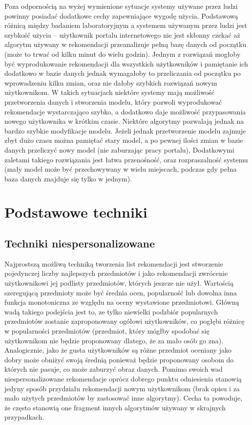 \documentclass{pracamgr}
\begin{document}
   Poza odpornością na wyżej wymienione sytuacje systemy używane przez ludzi powinny posiadać dodatkowe cechy zapewniające wygodę użycia.
   Podstawową różnicą między badaniem laboratoryjnym a systemem używanym przez ludzi jest szybkość użycia --
   użytkownik portalu internetowego nie jest skłonny czekać aż algorytm używany w rekomendacji przeanalizuje pełną bazę danych od początku
   (może to trwać od kilku minut do wielu godzin).
   Jednym z rozwiązań mogłoby być wyprodukowanie rekomendacji dla wszystkich użytkowników i pamiętanie ich dodatkowo w bazie danych
   jednak wymagałoby to przeliczania od początku po wprowadzeniu kilku zmian, oraz nie dałoby szybkich rozwiązań nowym użytkownikom.
   W takich sytuacjach niektóre systemy mają możliwość przetworzenia danych i stworzenia modelu,
   który pozwoli wyprodukować rekomendacje wystarczająco szybko, a dodatkowo daje możliwość przypasowania nowego użytkownika w krótkim czasie.
   Niektóre algorytmy pozwalają jednak na bardzo szybkie modyfikacje modelu.
   Jeżeli jednak przetworzenie modelu zajmuje zbyt dużo czasu można pamiętać stary model,
   a po pewnej ilości zmian w bazie danych przeliczyć nowy model (nie zaburzając pracy portalu),
   Dodatkowymi zaletami takiego rozwiązania jest łatwa przenośność, oraz rozpraszalność systemu (mały model może być przechowywany w wielu miejscach,
   podczas gdy pełna baza danych znajduje się tylko w jednym).

 \chapter{Podstawowe techniki}
  \section{Techniki niespersonalizowane}
   Najprostszą możliwą techniką tworzenia list rekomendacji jest stworzenie pojedynczej liczby najlepszych przedmiotów
   i jako rekomendacji zwrócenie użytkownikowi jej podlisty przedmiotów, których jeszcze nie użył.
   Wartością szeregującą przedmioty może być średnia ocen, popularność lub dowolna inna funkcja monotoniczna ze względu na oceny wystawione przedmiotowi.
   Główną wadą takiego podejścia jest to, ze tylko niewielki podzbiór popularnych przedmiotów zostanie zaproponowany ogółowi użytkowników,
   co pogłębi różnicę w popularności przedmiotów (przedmiot, który mógłby spodobać się użytkownikom nie będzie proponowany dlatego, że za mało osób go zna).
   Analogicznie, jako że gusta użytkowników są różne przedmiot oceniany jako dobry może obniżyć swoją średnią ponieważ będzie proponowany osobom do których nie pasuje,
   co może zaburzyć obraz danych.\newline
   Pomimo swoich wad niespersonalizowane rekomendacje oprócz dobrego punktu odniesienia stanowią jedyny sposób przydziału rekomendacji nowym użytkownikom
   (brak opisu i za mało użytych przedmiotów by zastosować inne algorytmy).
   Cecha ta powoduje, że często stanowią one fragment innych algorytmów używany w skrajnych przypadkach. 
\end{document}
